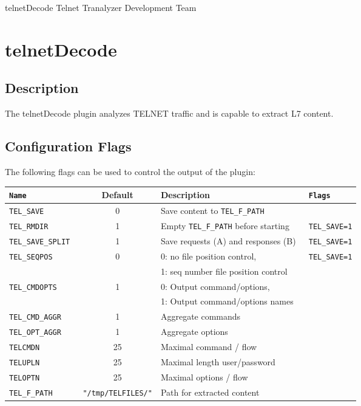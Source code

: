 \documentclass[documentation]{subfiles}
\begin{document}
\trantitle
    {telnetDecode}
    {Telnet}
    {Tranalyzer Development Team} %

\section{telnetDecode}\label{s:telnetDecode}

\subsection{Description}
The telnetDecode plugin analyzes TELNET traffic and is capable to extract L7 content.

\subsection{Configuration Flags}
The following flags can be used to control the output of the plugin:
\begin{longtable}{>{\tt}lcl>{\tt\small}l}
    \toprule
    {\bf Name} & {\bf Default} & {\bf Description} & {\bf Flags}\\
    \midrule\endhead%
    TEL\_SAVE        & 0  & Save content to {\tt\small TEL\_F\_PATH}       & \\
    TEL\_RMDIR       & 1  & Empty {\tt\small TEL\_F\_PATH} before starting & TEL\_SAVE=1\\
    TEL\_SAVE\_SPLIT & 1  & Save requests (A) and responses (B)            & TEL\_SAVE=1\\
    TEL\_SEQPOS      & 0  & 0: no file position control,                   & TEL\_SAVE=1\\
                     &    & 1: seq number file position control            & \\
    TEL\_CMDOPTS     & 1  & 0: Output command/options,                     & \\
                     &    & 1: Output command/options names                & \\
    TEL\_CMD\_AGGR   & 1  & Aggregate commands                             & \\
    TEL\_OPT\_AGGR   & 1  & Aggregate options                              & \\
    TELCMDN          & 25 & Maximal command / flow                         & \\
    TELUPLN          & 25 & Maximal length user/password                   & \\
    TELOPTN          & 25 & Maximal options / flow                         & \\
    TEL\_F\_PATH     & {\tt\small "/tmp/TELFILES/"}
                          & Path for extracted content                     & \\
    \bottomrule
\end{longtable}
\end{document}
